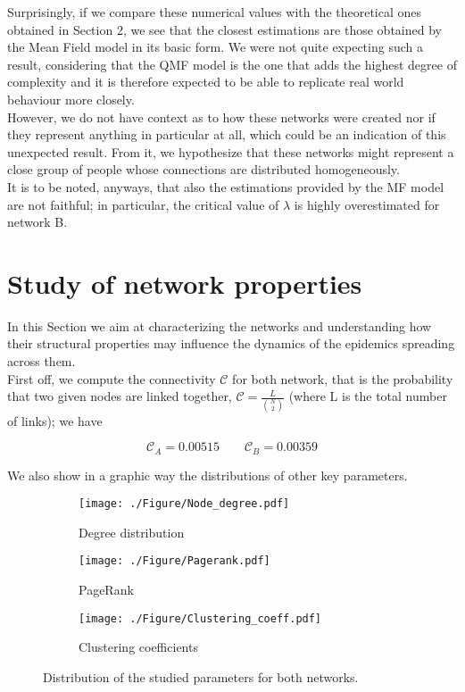 \documentclass[a4paper,11pt]{article}
\begin{document}
Surprisingly, if we compare these numerical values with the theoretical ones obtained in Section 2, we see that the closest estimations are those obtained by the Mean Field model in its basic form. We were not quite expecting such a result, considering that the QMF model is the one that adds the highest degree of complexity and it is therefore expected to be able to replicate real world behaviour more closely. 
\\
However, we do not have context as to how these networks were created nor if they represent anything in particular at all, which could be an indication of this unexpected result. From it, we hypothesize that these networks might represent a close group of people whose connections are distributed homogeneously.
\\
It is to be noted, anyways, that also the estimations provided by the MF model are not faithful; in particular, the critical value of $\lambda$ is highly overestimated for network B.


\section{Study of network properties}
In this Section we aim at characterizing the networks and understanding how their structural properties may influence the dynamics of the epidemics spreading across them.
\\
First off, we compute the connectivity $\mathcal{C}$ for both network, that is the probability that two given nodes are linked together, $\mathcal{C} = \frac{L}{\binom{N}{2}}$ (where L is the total number of links); we have

\begin{equation}
    \mathcal{C}_A = 0.00515 \qquad \mathcal{C}_B = 0.00359
\end{equation}

We also show in a graphic way the distributions of other key parameters.
\begin{figure}[htp]
\centering
\begin{subfigure}[b]{0.30\textwidth}
    \centering
    \texttt{[image: ./Figure/Node\_degree.pdf]}
    \caption{Degree distribution}
    \label{fig:nodedeg}
\end{subfigure}
\begin{subfigure}[b]{.30\textwidth}
  \centering
  \texttt{[image: ./Figure/Pagerank.pdf]}
  \caption{PageRank}
  \label{fig:pagerk}
\end{subfigure}%
\begin{subfigure}[b]{.30\textwidth}
  \centering
  \texttt{[image: ./Figure/Clustering\_coeff.pdf]}
  \caption{Clustering coefficients}
  \label{fig:clust}
\end{subfigure}
\caption{Distribution of the studied parameters for both networks.}
\label{fig:properties}
\end{figure}
\end{document}
